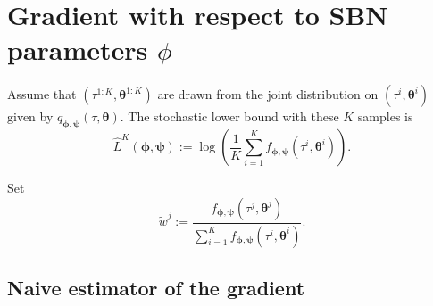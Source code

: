 \documentclass{article}
\begin{document}
\section*{Gradient with respect to SBN parameters $\phi$}

Assume that $(\tau^{1:K}, \bm \theta^{1:K})$ are drawn from the joint distribution on $(\tau^i, \bm \theta^i)$ given by $q_{\bm{\phi},\bm{\psi}}(\tau, \bm{\theta})$.
The stochastic lower bound with these $K$ samples is
\[
    \hat{L}^K(\bm{\phi},{\bm{\psi}}) :=
    \log\left( \frac{1}{K} \sum_{i=1}^K f_{\bm{\phi},{\bm{\psi}}}(\tau^i, \bm \theta^i) \right).
\]

Set
\[
    \tilde{w}^j :=
    \frac{f_{\bm{\phi},{\bm{\psi}}}(\tau^j, \bm \theta^j)}
    {\sum_{i=1}^K f_{\bm{\phi},{\bm{\psi}}}(\tau^i, \bm \theta^i)}.
\]

\subsection*{Naive estimator of the gradient}

\end{document}
